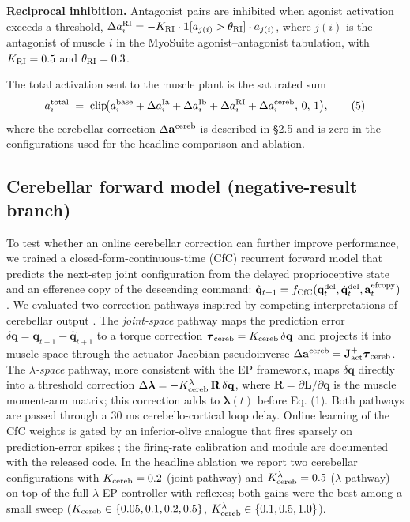 \documentclass[sn-basic]{sn-jnl}
\begin{document}
\textbf{Reciprocal inhibition.} Antagonist pairs are inhibited when
agonist activation exceeds a threshold,
\(\Delta a^{\rm RI}_{i} = -K_{\rm RI}\cdot\mathbf{1}[a_{j(i)}>\theta_{\rm RI}]\cdot a_{j(i)}\),
where \(j(i)\) is the antagonist of muscle \(i\) in the MyoSuite
agonist--antagonist tabulation, with \(K_{\rm RI} = 0.5\) and
\(\theta_{\rm RI} = 0.3\).

The total activation sent to the muscle plant is the saturated sum \[
a^{\rm total}_{i} \;=\; \mathrm{clip}\!\bigl(a^{\rm base}_{i} + \Delta a^{\rm Ia}_{i} + \Delta a^{\rm Ib}_{i} + \Delta a^{\rm RI}_{i} + \Delta a^{\rm cereb}_{i},\,0,\,1\bigr), \tag{5}
\] where the cerebellar correction \(\Delta\mathbf{a}^{\rm cereb}\) is
described in §2.5 and is zero in the configurations used for the
headline comparison and ablation.

\subsection{Cerebellar forward model (negative-result
branch)}

To test whether an online cerebellar correction can further improve
performance, we trained a closed-form-continuous-time (CfC) recurrent
forward model \citep{hasani2022} that predicts the next-step joint
configuration from the delayed proprioceptive state and an efference
copy of the descending command:
\(\hat{\mathbf{q}}_{t+1} = f_{\rm CfC}(\mathbf{q}^{\rm del}_{t}, \dot{\mathbf{q}}^{\rm del}_{t}, \mathbf{a}^{\rm efcopy}_{t})\).
We evaluated two correction pathways inspired by competing
interpretations of cerebellar output \citep{kawato1999, wolpert1998, ito2008}. The \emph{joint-space} pathway maps the prediction error
\(\delta\mathbf{q} = \mathbf{q}_{t+1}-\hat{\mathbf{q}}_{t+1}\) to a
torque correction
\(\boldsymbol{\tau}_{\rm cereb} = K_{\rm cereb}\,\delta\mathbf{q}\) and
projects it into muscle space through the actuator-Jacobian
pseudoinverse
\(\Delta\mathbf{a}^{\rm cereb} = \mathbf{J}_{\rm act}^{+}\boldsymbol{\tau}_{\rm cereb}\).
The \emph{$\lambda$-space} pathway, more consistent with the EP framework, maps
\(\delta\mathbf{q}\) directly into a threshold correction
\(\Delta\boldsymbol{\lambda} = -K_{\rm cereb}^{\lambda}\,\mathbf{R}\,\delta\mathbf{q}\),
where \(\mathbf{R} = \partial \mathbf{L}/\partial \mathbf{q}\) is the
muscle moment-arm matrix; this correction adds to
\(\boldsymbol{\lambda}(t)\) before Eq. (1). Both pathways are passed
through a 30 ms cerebello-cortical loop delay. Online learning of the
CfC weights is gated by an inferior-olive analogue that fires sparsely
on prediction-error spikes \citep{ito2008}; the firing-rate calibration and
module are documented with the released code. In the headline ablation
we report two cerebellar configurations with \(K_{\rm cereb} = 0.2\)
(joint pathway) and \(K_{\rm cereb}^{\lambda} = 0.5\) ($\lambda$ pathway) on top
of the full $\lambda$-EP controller with reflexes; both gains were the best
among a small sweep (\(K_{\rm cereb}\in\{0.05,0.1,0.2,0.5\}\),
\(K_{\rm cereb}^{\lambda}\in\{0.1,0.5,1.0\}\)).
\end{document}
